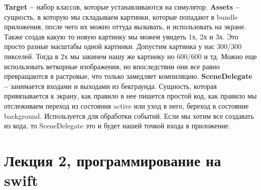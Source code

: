 \documentclass{article}
\begin{document}
    \textbf{Target --} набор классов, которые устанавливаются на симулятор. 
    \newline
    \textbf{Assets --} сущность, в которую мы складываем картинки, которые попадают в bundle приложения, после чего их можно оттуда вызывать, и использовать на экране. Также создав какую то новую картинку мы можем увидеть 1х, 2х и 3х. Это просто разные масштабы одной картинки. Допустим картинка у нас 300/300 пикселей. Тогда в 2х мы закинем нашу же картинку но 600/600 и тд. Можно еще использовать веткорные изображения, но впоследствии они все равно превращаются в растровые, что только замедляет компиляцию.
    \newline
    \textbf{SceneDelegate --} занимается входами и выходами из бекграунда. Сущность, которая привязывается к экрану, как правило в нее пишется простой код, как правило мы отслеживаем переход из состояния active или уход в него, береход в состояние background. Используется для обработки событий. Если мы хотим все создавать из кода, то SceneDelegate это и будет нашей точкой входа в приложение. 
    \section{Лекция 2, программирование на swift}
\end{document}
